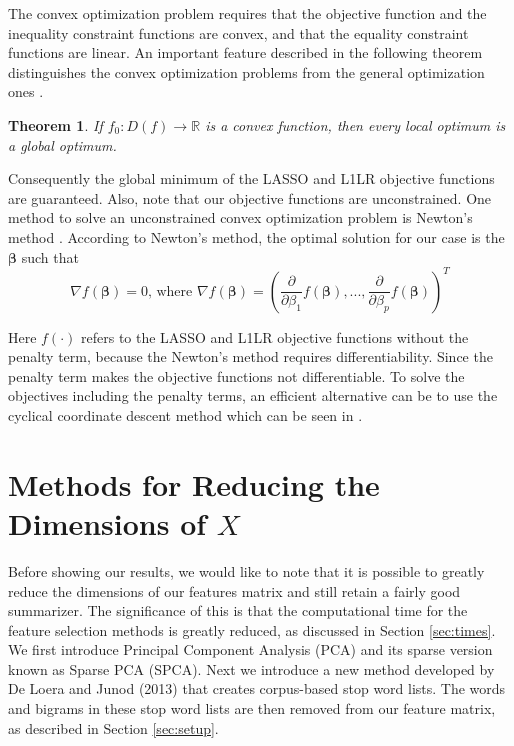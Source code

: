 \documentclass{article}
\newtheorem{Theorem}{Theorem}
\begin{document}
The convex optimization problem requires that the objective function and the inequality constraint functions are convex, and that the equality constraint functions are linear. An important feature described in the following theorem distinguishes the convex optimization problems from the general optimization ones \cite{convex}.

\vspace*{\baselineskip}
\begin{Theorem}\label{thm:PC}
If $f_0: D(f) \rightarrow \mathbb{R}$ is a convex function, then every local optimum is a global optimum.
\end{Theorem}

Consequently the global minimum of the LASSO and L1LR objective functions are guaranteed. Also, note that our objective functions are unconstrained. One method to solve an unconstrained convex optimization problem is Newton's method \cite{convex}. According to Newton's method, the optimal solution for our case is the $\boldsymbol{\beta}$ such that
$$\nabla f(\boldsymbol{\beta})=0 \text{, where } \nabla f(\boldsymbol{\beta})=(\frac{\partial}{\partial \beta_1} f(\boldsymbol{\beta}),...,\frac{\partial}{\partial \beta_p} f(\boldsymbol{\beta}))^T$$

Here $f(\cdot)$ refers to the LASSO and L1LR objective functions without the penalty term, because the Newton's method requires differentiability. Since the penalty term makes the objective functions not differentiable. To solve the objectives including the penalty terms, an efficient alternative can be to use the cyclical coordinate descent method which can be seen in \cite{cyclical}.
 
\section{Methods for Reducing the Dimensions of $X$} \label{sec:dimension} %
\par
Before showing our results, we would like to note that it is possible to greatly reduce the dimensions of our features matrix and still retain a fairly good summarizer. The significance of this is that the computational time for the feature selection methods is greatly reduced, as discussed in Section \ref{sec:times}. We first introduce Principal Component Analysis (PCA) and its sparse version known as Sparse PCA (SPCA).  Next we introduce a new method developed by De Loera and Junod (2013) that creates corpus-based stop word lists.  The words and bigrams in these stop word lists are then removed from our feature matrix, as described in Section \ref{sec:setup}.
\end{document}
